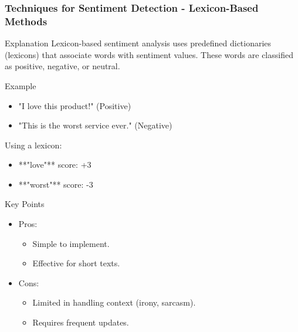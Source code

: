 \documentclass[aspectratio=169]{beamer}
\begin{document}
\begin{frame}
    \frametitle{Techniques for Sentiment Detection - Lexicon-Based Methods}
    \begin{block}{Explanation}
        Lexicon-based sentiment analysis uses predefined dictionaries (lexicons) that 
        associate words with sentiment values. These words are classified as positive, 
        negative, or neutral.
    \end{block}
    
    \begin{block}{Example}
        \begin{itemize}
            \item "I love this product!" (Positive)
            \item "This is the worst service ever." (Negative)
        \end{itemize}
        Using a lexicon:
        \begin{itemize}
            \item **"love"** score: +3
            \item **"worst"** score: -3
        \end{itemize}
    \end{block}
    
    \begin{block}{Key Points}
        \begin{itemize}
            \item Pros:
            \begin{itemize}
                \item Simple to implement.
                \item Effective for short texts.
            \end{itemize}
            \item Cons:
            \begin{itemize}
                \item Limited in handling context (irony, sarcasm).
                \item Requires frequent updates.
            \end{itemize}
        \end{itemize}
    \end{block}
\end{frame}
\end{document}

